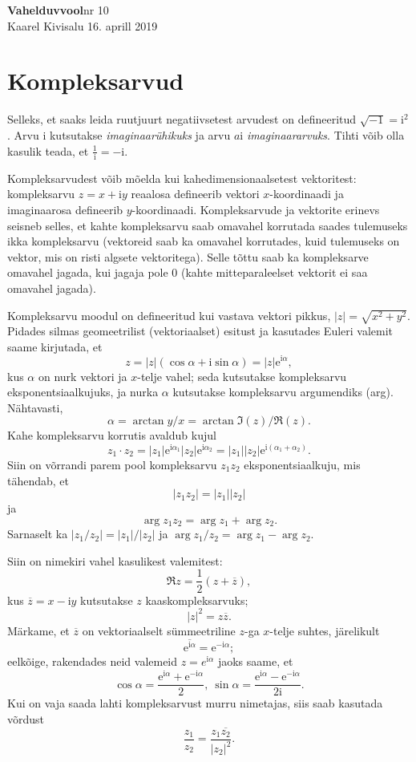\documentclass[a4paper,11pt,twocolumn]{article}
\newcommand*\conj[1]{\overline{#1}}
\newcommand*\iu{\mathrm{i}}
\begin{document}
{\huge \textbf{Vahelduvvool}\hfill \normalsize{nr 10}} \\
{Kaarel Kivisalu \hfill 16. aprill 2019}

\section{Kompleksarvud}
Selleks, et saaks leida ruutjuurt negatiivsetest arvudest on defineeritud $\sqrt{-1} = \iu^2$. Arvu $\iu$ kutsutakse \textit{imaginaarühikuks} ja arvu $a\iu$ \textit{imaginaararvuks}.
Tihti võib olla kasulik teada, et $\frac{1}{\iu }=-\iu$.

Kompleksarvudest võib mõelda kui kahedimensionaalsetest vektoritest: kompleksarvu \(z = x + \iu y\) reaalosa defineerib vektori \(x\)-koordinaadi ja imaginaarosa defineerib \(y\)-koordinaadi. Kompleksarvude ja vektorite erinevs seisneb selles, et kahte kompleksarvu saab omavahel korrutada saades tulemuseks ikka kompleksarvu (vektoreid saab ka omavahel korrutades, kuid tulemuseks on vektor, mis on risti algsete vektoritega). Selle tõttu saab ka kompleksarve omavahel jagada, kui jagaja pole \num{0} (kahte mitteparaleelset vektorit ei saa omavahel jagada).

Kompleksarvu moodul on defineeritud kui vastava vektori pikkus, \(|z|=\sqrt{x^2+y^2}\). Pidades silmas geomeetrilist (vektoriaalset) esitust ja kasutades Euleri valemit saame kirjutada, et
\[z=|z|(\cos \alpha + \iu \sin \alpha)=|z|\mathrm{e}^{\iu\alpha},\]
kus \(\alpha\) on nurk vektori ja \(x\)-telje vahel; seda kutsutakse kompleksarvu eksponentsiaalkujuks, ja nurka \(\alpha\) kutsutakse kompleksarvu argumendiks (arg). Nähtavasti,
\[\alpha = \arctan y/x=\arctan \Im(z)/\Re(z).\]
Kahe kompleksarvu korrutis avaldub kujul
\[z_1 \cdot z_2 = |z_1|\mathrm{e}^{\iu\alpha_1}|z_2|\mathrm{e}^{\iu\alpha_2}=|z_1||z_2|\mathrm{e}^{\iu(\alpha_1+\alpha_2)}.\]
Siin on võrrandi parem pool kompleksarvu \(z_1 z_2\) eksponentsiaalkuju, mis tähendab, et
\[|z_1 z_2| = |z_1||z_2|\]
ja
\[\arg z_1z_2=\arg z_1 + \arg z_2.\]
Sarnaselt ka \(|z_1/z_2|=|z_1|/|z_2|\) ja \(\arg z_1/z_2=\arg z_1-\arg z_2\).

Siin on nimekiri vahel kasulikest valemitest:
\[\Re{z}=\frac{1}{2}(z+\conj{z}),\]
kus \(\conj{z}=x-\iu y\) kutsutakse \(z\) kaaskompleksarvuks;
\[|z|^2=z\conj{z}.\]
Märkame, et \(\conj{z}\) on vektoriaalselt sümmeetriline \(z\)-ga \(x\)-telje suhtes, järelikult
\[\conj{\mathrm{e}^{\iu \alpha}}=\mathrm{e}^{-\iu \alpha};\]
eelkõige, rakendades neid valemeid \(z=e^{\iu\alpha}\) jaoks saame, et
\[\cos \alpha = \frac{\mathrm{e}^{\iu \alpha}+ \mathrm{e}^{-\iu \alpha}}{2},\ \sin \alpha = \frac{\mathrm{e}^{\iu \alpha}-\mathrm{e}^{-\iu \alpha}}{2\iu }.\]
Kui on vaja saada lahti kompleksarvust murru nimetajas, siis saab kasutada võrdust
\[\frac{z_1}{z_2}=\frac{z_1 \conj{z_2}}{|z_2|^2}.\]
\end{document}
